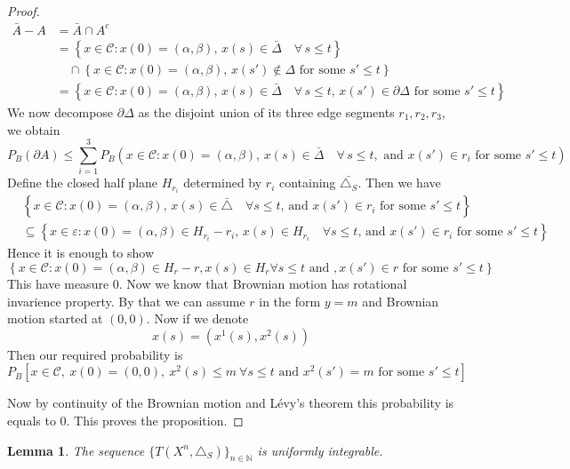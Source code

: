 \documentclass[11pt, a4paper, oneside]{report}
\numberwithin{equation}{section}
\newtheorem{lemma}[theorem]{Lemma}
\begin{document}
\begin{proof}
\begin{align*}
\bar{A} - A &= \bar{A} \cap A^c \\
&= \left\{ x \in \mathcal{C} : x(0) = (\alpha, \beta),\, x(s) \in \bar{\Delta} \quad \forall\, s \leq t \right\} \\
&\quad \cap 
\left\{ x \in \mathcal{C} : x(0) = (\alpha, \beta),\, x(s') \notin \Delta \text{ for some } s' \leq t \right\} \\
&= \left\{ x \in \mathcal{C} : x(0) = (\alpha, \beta),\, x(s) \in \bar{\Delta} \quad \forall\, s \leq t,\, 
x(s') \in \partial \Delta \text{ for some } s' \leq t \right\}
\end{align*}
We now decompose \( \partial \Delta \) as the disjoint union of its three edge segments \( r_1, r_2, r_3 \), we obtain
\[
P_B(\partial A) \leq \sum_{i=1}^3 P_B \left( x \in \mathcal{C} : x(0) = (\alpha, \beta),\, x(s) \in \bar{\Delta} \quad \forall\, s \leq t, \text{ and } x(s') \in r_i \text{ for some } s' \leq t \right)
\]
Define the closed half plane \( H_{r_i} \) determined by \( r_i\) containing \( \bar{\triangle_S} \).  
Then we have  
\begin{align*}
&\left\{ x \in \mathcal{C} : x(0) = (\alpha, \beta), \, x(s) \in \bar{\triangle} \quad \forall s \leq t, \, 
\text{and } x(s') \in r_i \text{ for some } s' \leq t \right\} \\
&\subseteq \left\{ x \in \varepsilon : x(0) = (\alpha, \beta) \in H_{r_i} - r_i,\, 
x(s) \in H_{r_i} \quad \forall s \leq t, \, 
\text{and } x(s') \in r_i \text{ for some } s' \leq t \right\}
\end{align*}
Hence it is enough to show  
\[
\left\{ x \in \mathcal{C}: x(0) = (\alpha, \beta) \in H_{r} - r, x(s) \in H_r \forall s \leq t \text{ and }, x(s') \in r\text{ for some } s' \leq t \right\}
\]
This have measure 0.
Now we know that Brownian motion has rotational invarience property. 
By that we can assume \(r\) in the form \( y = m \) and Brownian motion started at \( (0,0) \). Now if we denote 
\[
x(s) = (x^1(s), x^2(s))
\]
Then our required probability is\[
P_B \left[ x \in \mathcal{C},\ x(0) = (0,0),\ x^2(s) \leq m \ \forall s \leq t \text{ and } x^2(s') = m \text{ for some } s' \leq t\right]
\]

Now by continuity of the Brownian motion and Lévy's theorem this probability is equals to 0. This proves the proposition.
\end{proof}
\begin{lemma}\cite[Lemma 4]{research}
The sequence \( \{T(X^n, \triangle_S)\}_{n \in \mathbb{N}} \) is uniformly integrable.
\end{lemma}
\end{document}

